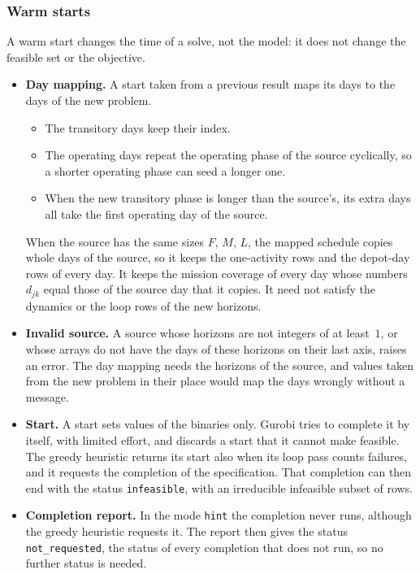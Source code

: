 \documentclass[11pt,a4paper]{article}
\theoremstyle{plain}
\theoremstyle{definition}
\theoremstyle{remark}
\begin{document}
\subsubsection{Warm starts}
\label{sec:impl_warm}

A warm start changes the time of a solve, not the model: it does not change the feasible set or the objective.
\begin{itemize}
  \item \textbf{Day mapping.} A start taken from a previous result maps its days to the days of the new problem.
    \begin{itemize}
      \item The transitory days keep their index.
      \item The operating days repeat the operating phase of the source cyclically, so a shorter operating phase can seed a longer one.
      \item When the new transitory phase is longer than the source's, its extra days all take the first operating day of the source.
    \end{itemize}
    When the source has the same sizes $F$, $M$, $L$, the mapped schedule copies whole days of the source, so it keeps the one-activity rows and the depot-day rows of every day.
    It keeps the mission coverage of every day whose numbers $d_{jk}$ equal those of the source day that it copies.
    It need not satisfy the dynamics or the loop rows of the new horizons.
  \item \textbf{Invalid source.} A source whose horizons are not integers of at least~$1$, or whose arrays do not have the days of these horizons on their last axis, raises an error.
    The day mapping needs the horizons of the source, and values taken from the new problem in their place would map the days wrongly without a message.
  \item \textbf{Start.} A start sets values of the binaries only.
    Gurobi tries to complete it by itself, with limited effort, and discards a start that it cannot make feasible.
    The greedy heuristic returns its start also when its loop pass counts failures, and it requests the completion of the specification.
    That completion can then end with the status \texttt{infeasible}, with an irreducible infeasible subset of rows.
  \item \textbf{Completion report.} In the mode \texttt{hint} the completion never runs, although the greedy heuristic requests it.
    The report then gives the status \texttt{not\_requested}, the status of every completion that does not run, so no further status is needed.

\end{itemize}
\end{document}

